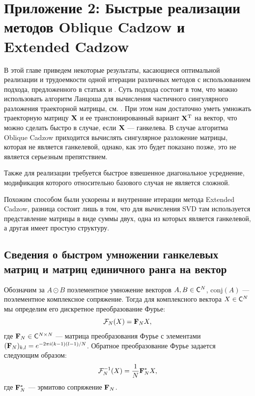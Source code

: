 \documentclass[12pt, specialist, subf,href,colorlinks=true,substylefile = spbu.rtx]{disser}
\theoremstyle{remark}
\theoremstyle{definition}
\begin{document}
\chapter{Приложение 2: Быстрые реализации методов Oblique Cadzow и Extended Cadzow}

В этой главе приведем некоторые результаты, касающиеся оптимальной реализации и трудоемкости одной итерации различных методов с использованием подхода, предложенного в статьях \cite{Korobeynikov2010} и \cite{Golyandina2013a}. Суть подхода состоит в том, что можно использовать алгоритм Ланцоша для вычисления частичного сингулярного разложения траекторной матрицы, см. \cite{Korobeynikov2010}. При этом нам достаточно уметь умножать траекторную матрицу $\mathbf{X}$ и ее транспонированный вариант $\mathbf{X}^{\mathrm{T}}$ на вектор, что можно сделать быстро в случае, если $\mathbf{X}$ --- ганкелева. В случае алгоритма Oblique Cadzow приходится вычислять сингулярное разложение матрицы, которая не является ганкелевой, однако, как это будет показано позже, это не является серьезным препятствием.

Также для реализации требуется быстрое взвешенное диагональное усреднение, модификация которого относительно базового случая не является сложной.

Похожим способом были ускорены и внутренние итерации метода Extended Cadzow, разница состоит лишь в том, что для вычисления SVD там используется представление матрицы в виде суммы двух, одна из которых является ганкелевой, а другая имеет простую структуру.

\section{Сведения о быстром умножении ганкелевых матриц и матриц единичного ранга на вектор}
Обозначим за $A \odot B$ поэлементное умножение векторов $A, B \in \mathsf{C}^N$, $\text{conj}(A)$ --- поэлементное комплексное сопряжение. Тогда для комплексного вектора $X \in \mathsf{C}^N$ мы определим его дискретное преобразование Фурье:
\begin{equation}\label{Fourier_transform}
\mathcal{F}_N(X) = \mathbf{F}_N X,
\end{equation}
где $\mathbf{F}_N \in \mathsf{C}^{N \times N}$ --- матрица преобразования Фурье с элементами $(\mathbf{F}_N)_{k,l} = e^{-2 \pi i(k-1)(l-1)/N}$. Обратное преобразование Фурье задается следующим образом:
\begin{equation*}
\mathcal{F}^{-1}_N(X) = \frac{1}{N}\mathbf{F}^*_N X,
\end{equation*}
где $\mathbf{F}^*_N$ --- эрмитово сопряжение $\mathbf{F}_N$.
\end{document}
